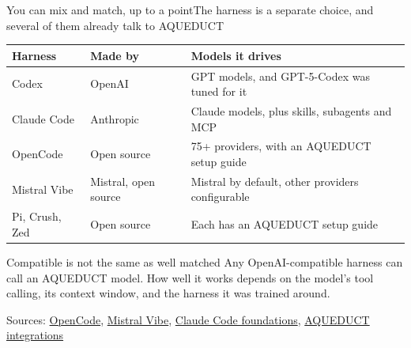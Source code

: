 \documentclass[aspectratio=169]{beamer}
\newcommand{\srcmulti}[1]{\par\vfill{\fontsize{7}{8}\selectfont\color{ACINgray}Sources: #1}}
\begin{document}
\begin{frame}{You can mix and match, up to a point}{The harness is a separate choice, and several of them already talk to AQUEDUCT}
\footnotesize
\renewcommand{\arraystretch}{1.2}
\begin{tabular}{@{}P{2.6cm}P{2.9cm}P{6.9cm}@{}}
\toprule
\textbf{Harness} & \textbf{Made by} & \textbf{Models it drives} \\
\midrule
Codex & OpenAI & GPT models, and GPT-5-Codex was tuned for it \\
Claude Code & Anthropic & Claude models, plus skills, subagents and MCP \\
OpenCode & Open source & 75+ providers, with an AQUEDUCT setup guide \\
Mistral Vibe & Mistral, open source & Mistral by default, other providers configurable \\
Pi, Crush, Zed & Open source & Each has an AQUEDUCT setup guide \\
\bottomrule
\end{tabular}

\vspace{2mm}
\begin{block}{Compatible is not the same as well matched}
Any OpenAI-compatible harness can call an AQUEDUCT model. How well it works depends on the model's tool calling, its context window, and the harness it was trained around.
\end{block}
\srcmulti{\href{https://opencode.ai/}{OpenCode}, \href{https://github.com/mistralai/mistral-vibe}{Mistral Vibe}, \href{https://www.anthropic.com/webinars/claude-code-foundations}{Claude Code foundations}, \href{https://datalab.tuwien.ac.at/aiml/aqueduct/integrations/}{AQUEDUCT integrations}}
\end{frame}
\end{document}
